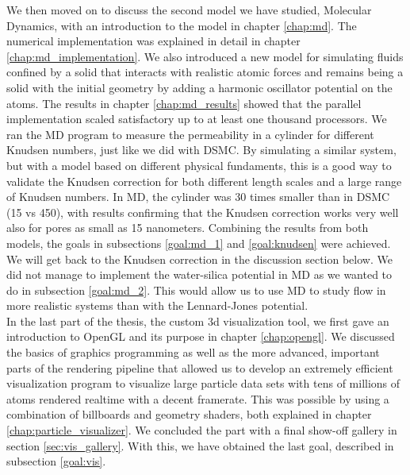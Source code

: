 We then moved on to discuss the second model we have studied, Molecular Dynamics, with an introduction to the model in chapter \ref{chap:md}. The numerical implementation was explained in detail in chapter \ref{chap:md_implementation}. We also introduced a new model for simulating fluids confined by a solid that interacts with realistic atomic forces and remains being a solid with the initial geometry by adding a harmonic oscillator potential on the atoms. The results in chapter \ref{chap:md_results} showed that the parallel implementation scaled satisfactory up to at least one thousand processors. We ran the MD program to measure the permeability in a cylinder for different Knudsen numbers, just like we did with DSMC. By simulating a similar system, but with a model based on different physical fundaments, this is a good way to validate the Knudsen correction for both different length scales and a large range of Knudsen numbers. In MD, the cylinder was 30 times smaller than in DSMC (\unit{15}{\nano\meter} vs \unit{450}{\nano\meter}), with results confirming that the Knudsen correction works very well also for pores as small as 15 nanometers. Combining the results from both models, the goals in subsections \ref{goal:md_1} and \ref{goal:knudsen} were achieved. We will get back to the Knudsen correction in the discussion section below. We did not manage to implement the water-silica potential in MD as we wanted to do in subsection \ref{goal:md_2}. This would allow us to use MD to study flow in more realistic systems than with the Lennard-Jones potential. 
\\
In the last part of the thesis, the custom 3d visualization tool, we first gave an introduction to OpenGL and its purpose in chapter \ref{chap:opengl}. We discussed the basics of graphics programming as well as the more advanced, important parts of the rendering pipeline that allowed us to develop an extremely efficient visualization program to visualize large particle data sets with tens of millions of atoms rendered realtime with a decent framerate. This was possible by using a combination of billboards and geometry shaders, both explained in chapter \ref{chap:particle_visualizer}. We concluded the part with a final show-off gallery in section \ref{sec:vis_gallery}. With this, we have obtained the last goal, described in subsection \ref{goal:vis}. 